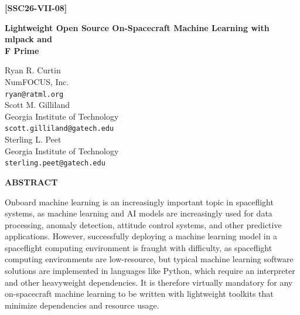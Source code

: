 \documentclass[10pt, fleqn]{article}
\begin{document}
\begin{flushright}
\Large %

\textbf{[SSC26-VII-08]}
\end{flushright}
\begin{centering}      
\large %

\textbf{Lightweight Open Source On-Spacecraft Machine Learning with mlpack and \\F Prime}\\
\vspace{0.5cm}
\normalsize %

Ryan R. Curtin\\
NumFOCUS, Inc.\\
\texttt{ryan@ratml.org}\\
\vspace{0.5cm}
Scott M. Gilliland\\
Georgia Institute of Technology\\
\texttt{scott.gilliland@gatech.edu}\\
\vspace{0.5cm}
Sterling L. Peet\\
Georgia Institute of Technology\\
\texttt{sterling.peet@gatech.edu}\\

\end{centering}

\begin{centering}
    \vspace{0.5cm}
    \centerline{\textbf{ABSTRACT}}
    \vspace{0.3cm}
\end{centering}

Onboard machine learning is an increasingly important topic in spaceflight systems,
as machine learning and AI models are increasingly used for
data processing, anomaly detection, attitude control systems, and other predictive applications.
However, successfully deploying a machine learning model
in a spaceflight computing environment is
fraught with difficulty,
as spaceflight computing environments are low-resource,
but typical machine learning software solutions are implemented in languages like Python,
which require an interpreter and other heavyweight dependencies.
It is therefore virtually mandatory for
any on-spacecraft machine learning
to be written with lightweight toolkits
that minimize dependencies and resource usage.
\end{document}
